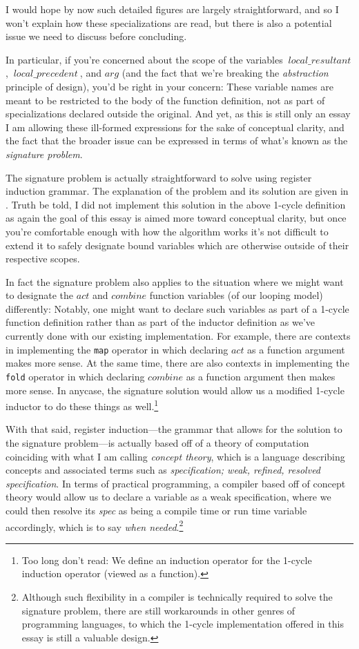\documentclass[twoside]{article}
\newcommand{\locr}[1][\_]{local#1resultant}
\newcommand{\locp}[1][\_]{local#1precedent}
\begin{document}
I would hope by now such detailed figures are largely straightforward, and so I won't explain how these specializations
are read, but there is also a potential issue we need to discuss before concluding.

In particular, if you're concerned about the scope of the variables $ \ \locr\ $, $ \ \locp\ $, and $ arg $
(and the fact that we're breaking the \emph{abstraction} principle of design), you'd be right in your concern:
These variable names are meant to be restricted to the body of the function definition, not as part of specializations
declared outside the original. And yet, as this is still only an essay I am allowing these ill-formed expressions for
the sake of conceptual clarity, and the fact that the broader issue can be expressed in terms of what's known as the
\emph{signature problem}.

The signature problem is actually straightforward to solve using register induction grammar. The explanation of the problem
and its solution are given in \cite{nikfi}. Truth be told, I did not implement this solution in the above 1-cycle definition
as again the goal of this essay is aimed more toward conceptual clarity, but once you're comfortable enough with how the
algorithm works it's not difficult to extend it to safely designate bound variables which are otherwise outside of their
respective scopes.

In fact the signature problem also applies to the situation where we might want to designate the $ act $ and $ combine $
function variables (of our looping model) differently: Notably, one might want to declare such variables as part of
a 1-cycle function definition rather than as part of the inductor definition as we've currently done with our existing
implementation. For example, there are contexts in implementing the \texttt{map} operator in which declaring $ act $ as
a function argument makes more sense. At the same time, there are also contexts in implementing the \texttt{fold}
operator in which declaring $ combine $ as a function argument then makes more sense. In anycase, the signature
solution would allow us a modified 1-cycle inductor to do these things as well.\footnote{Too long don't read: We define
an induction operator for the 1-cycle induction operator (viewed as a function).}

With that said, register induction---the grammar that allows for the solution to the signature problem---is actually based
off of a theory of computation coinciding with what I am calling \emph{concept theory}, which is a language describing concepts
and associated terms such as \emph{specification; weak, refined, resolved specification}. In terms of practical programming,
a compiler based off of concept theory would allow us to declare a variable as a weak specification, where we could then resolve
its \emph{spec} as being a compile time or run time variable accordingly, which is to say \emph{when needed}.\footnote{Although
such flexibility in a compiler is technically required to solve the signature problem, there are still workarounds in other
genres of programming languages, to which the 1-cycle implementation offered in this essay is still a valuable design.}
\end{document}
